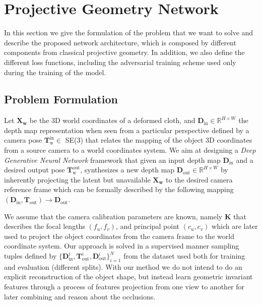 \section{Projective Geometry Network}
In this section we give the formulation of the problem that we want to solve and describe the proposed network architecture, which is composed by different components from classical projective geometry. In addition, we also define the different loss functions, including the adversarial training scheme used only during the training of the model.


\subsection{Problem Formulation}
Let $\mathbf{X_w}$ be the 3D world coordinates of a deformed cloth, and $\mathbf{D}_{\textrm{in}} \in \mathbb{R}^{H \times W}$ the depth map representation when seen from a particular perspective defined by a camera pose $\mathbf{T}_{\textrm{w}}^{\textrm{in}}\in$ SE(3) that relates the mapping of the object 3D coordinates from a source camera to a world coordinates system. We aim at designing a \textit{Deep Generative Neural Network} framework that given an input depth map $\mathbf{D}_{\textrm{in}}$ and a desired output pose $\mathbf{T}_{\textrm{w}}^{\textrm{out}}$, synthesizes a new depth map $\mathbf{D}_{\textrm{out}}\in \mathbb{R}^{H \times W}$ by inherently projecting the latent but unavailable $\mathbf{X_w}$ to the desired camera reference frame which can be formally described by the following mapping $(\mathbf{D}_{\textrm{in}}, \mathbf{T}_{\textrm{out}})\rightarrow \mathbf{D}_{\textrm{out}}$.

We assume that the camera calibration parameters are known, namely $\mathbf{K}$ that describes the focal lengths $(f_u, f_v)$, and principal point $(c_u, c_v)$ which are later  used to project the object coordinates from the camera frame to the world coordinate system. Our approach is solved in a supervised manner sampling tuples defined by $\{\mathbf{D}_{\textrm{in}}^i, \mathbf{T}_{\textrm{out}}^i, \mathbf{D}_{\textrm{out}}^i\}_{i=1}^N$ from the dataset used both for training and evaluation (different splits). With our method we do not intend to do an explicit reconstruction of the object shape, but instead learn geometric invariant features through a process of features projection from one view to another for later combining and reason about the occlusions.

